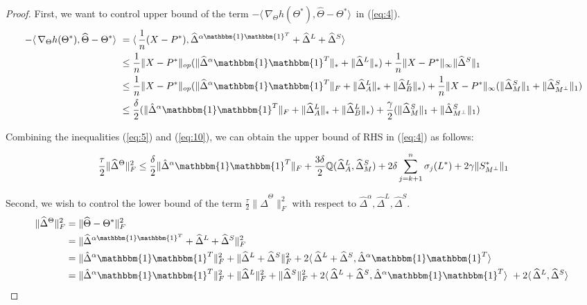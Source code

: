 \documentclass[AMS,STIX1COL]{WileyNJD-v2}
\begin{document}
\begin{proof}
First, we want to control upper bound of the term $-\langle\,\nabla_{\Theta}h(\Theta^{*}),\widehat{\Theta}-\Theta^{*} \rangle\,$
in (\ref{eq:4}).
\begin{align}
-\langle\,\nabla_{\Theta}h(\Theta^{*}),\widehat{\Theta}-\Theta^{*} \rangle\  \nonumber
&=\langle\, \frac{1}{n} (X - P^*), \widehat\Delta^{\alpha\mathbbm{1}\mathbbm{1}^T} + \widehat\Delta^{L} + \widehat\Delta^{S} \rangle\ \\ \nonumber
&\leq \frac{1}{n} \|X - P^*\|_{op}(\|\widehat{\Delta}^{\alpha}\mathbbm{1}\mathbbm{1}^T\|_\ast + \|\widehat{\Delta}^{L}\|_\ast) +  \frac{1}{n} \|X - P^*\|_{\infty}\|\widehat{\Delta}^{S}\|_{1} \\ \nonumber
&\leq \frac{1}{n} \|X - P^*\|_{op}(\|\widehat{\Delta}^{\alpha}\mathbbm{1}\mathbbm{1}^T\|_{F} + \|\widehat{\Delta}^{L}_{A}\|_\ast + \|\widehat{\Delta}^{L}_{B}\|_\ast) +
\frac{1}{n} \|X - P^*\|_{\infty}(\|\widehat{\Delta}^{S}_{M}\|_{1} +
\|\widehat{\Delta}^{S}_{M^{\perp}}\|_{1}) \\
&\leq \frac{\delta}{2}(\|\hat{\Delta}^{\alpha}\mathbbm{1}\mathbbm{1}^T\|_{F} + \|\widehat{\Delta}^{L}_{A}\|_\ast + \|\widehat{\Delta}^{L}_{B}\|_\ast) + \frac{\gamma}{2}(\|\widehat{\Delta}^{S}_{M}\|_{1} +
\|\hat{\Delta}^{S}_{M^{\perp}}\|_{1})  \label{eq:10}
\end{align}

Combining the inequalities (\ref{eq:5}) and (\ref{eq:10}), we can obtain the upper bound of RHS in (\ref{eq:4}) as follows:

\begin{equation}
    \frac{\tau}{2}\|\widehat{\Delta}^{\Theta}\|_{F}^{2} \leq
    \frac{\delta}{2}\|\hat{\Delta}^{\alpha}\mathbbm{1}\mathbbm{1}^T\|_{F} +
    \frac{3\delta}{2}\mathbb{Q}(\widehat{\Delta}^L_{A},\widehat{\Delta}^S_{M})
    +2 \delta \sum_{j=k+1}^{n} \sigma_{j}(L^*) + 2\gamma \|S^*_{M^\perp}\|_{1}
    \label{eq:11}
\end{equation}

Second, we wish to control the lower bound of the term  $\frac{\tau}{2}\|\hat{\Delta}^{\Theta}\|_{F}^{2}$ with respect to $\hat{\Delta}^{\alpha},\hat{\Delta}^{L},\hat{\Delta}^{S}$.
\begin{align}
\|\widehat{\Delta}^{\Theta}\|_{F}^{2}  \nonumber
&= \|\widehat{\Theta}-\Theta^{*} \|_{F}^{2} \\ \nonumber
&= \|\widehat\Delta^{\alpha\mathbbm{1}\mathbbm{1}^T} + \widehat\Delta^{L} + \widehat\Delta^{S}\|_{F}^{2} \\ \nonumber
&= \|\hat{\Delta}^{\alpha}\mathbbm{1}\mathbbm{1}^T\|_{F}^{2} + \|\widehat{\Delta}^{L}+\widehat{\Delta}^{S}\|_{F}^{2} +
2 \langle\, \widehat\Delta^{L} + \widehat\Delta^{S} ,\hat{\Delta}^{\alpha}\mathbbm{1}\mathbbm{1}^T \rangle\ \\
&=  \|\hat{\Delta}^{\alpha}\mathbbm{1}\mathbbm{1}^T\|_{F}^{2} + \|\widehat{\Delta}^{L}\|_{F}^{2} + \|\widehat{\Delta}^{S}\|_{F}^{2} +
2 \langle\, \widehat\Delta^{L} + \widehat\Delta^{S} ,\hat{\Delta}^{\alpha}\mathbbm{1}\mathbbm{1}^T \rangle\ +
2 \langle\, \widehat\Delta^{L}, \widehat\Delta^{S} \rangle\  \label{eq:12}
\end{align}


\end{proof}
\end{document}
